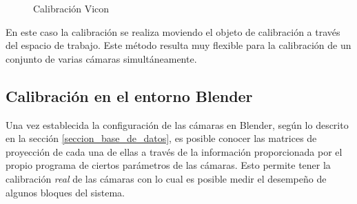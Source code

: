\begin{figure}[H]
        \centering
        
        \hspace{1.8cm}
  \caption{Calibración Vicon}
      \label{vicon}
\end{figure}

En este caso la calibración se realiza moviendo el objeto de calibración a través del espacio de trabajo. Este método resulta muy flexible para la calibración de un conjunto de varias cámaras simultáneamente.


\subsection{Calibración en el entorno Blender}

Una vez establecida la configuración de las cámaras en  Blender, según lo descrito en la sección \ref{seccion_base_de_datos}, es posible conocer las matrices de proyección de cada una de ellas a través de la información proporcionada por el propio programa de ciertos parámetros de las cámaras. Esto permite tener la calibración \textit{real} de las cámaras con lo cual es posible medir el desempeño de algunos bloques del sistema.\\


